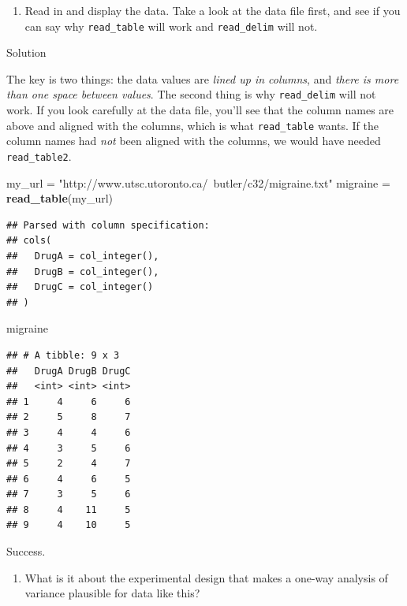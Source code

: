 \documentclass[]{tufte-book}
\newenvironment{Shaded}{}{}
\newcommand{\KeywordTok}[1]{\textcolor[rgb]{0.00,0.44,0.13}{\textbf{#1}}}
\newcommand{\NormalTok}[1]{#1}
\newcommand{\StringTok}[1]{\textcolor[rgb]{0.25,0.44,0.63}{#1}}
\providecommand{\tightlist}{%
  \setlength{\itemsep}{0pt}\setlength{\parskip}{0pt}}
\theoremstyle{definition}
\theoremstyle{definition}
\theoremstyle{definition}
\theoremstyle{remark}
\begin{document}
\begin{enumerate}
\def\labelenumi{(\alph{enumi})}
\tightlist
\item
  Read in and display the data. Take a look at the data file first, and
  see if you can say why \texttt{read\_table} will work and
  \texttt{read\_delim} will not.
\end{enumerate}

Solution

The key is two things: the data values are \emph{lined up in columns},
and \emph{there is more than one space between values}. The second thing
is why \texttt{read\_delim} will not work. If you look carefully at the
data file, you'll see that the column names are above and aligned with
the columns, which is what \texttt{read\_table} wants. If the column
names had \emph{not} been aligned with the columns, we would have needed
\texttt{read\_table2}.

\begin{Shaded}
\begin{Highlighting}[]
\NormalTok{my_url =}\StringTok{ "http://www.utsc.utoronto.ca/~butler/c32/migraine.txt"}
\NormalTok{migraine =}\StringTok{ }\KeywordTok{read_table}\NormalTok{(my_url)}
\end{Highlighting}
\end{Shaded}

\begin{verbatim}
## Parsed with column specification:
## cols(
##   DrugA = col_integer(),
##   DrugB = col_integer(),
##   DrugC = col_integer()
## )
\end{verbatim}

\begin{Shaded}
\begin{Highlighting}[]
\NormalTok{migraine}
\end{Highlighting}
\end{Shaded}

\begin{verbatim}
## # A tibble: 9 x 3
##   DrugA DrugB DrugC
##   <int> <int> <int>
## 1     4     6     6
## 2     5     8     7
## 3     4     4     6
## 4     3     5     6
## 5     2     4     7
## 6     4     6     5
## 7     3     5     6
## 8     4    11     5
## 9     4    10     5
\end{verbatim}

Success.

\begin{enumerate}
\def\labelenumi{(\alph{enumi})}
\setcounter{enumi}{1}
\tightlist
\item
  What is it about the experimental design that makes a one-way analysis
  of variance plausible for data like this?
\end{enumerate}
\end{document}
